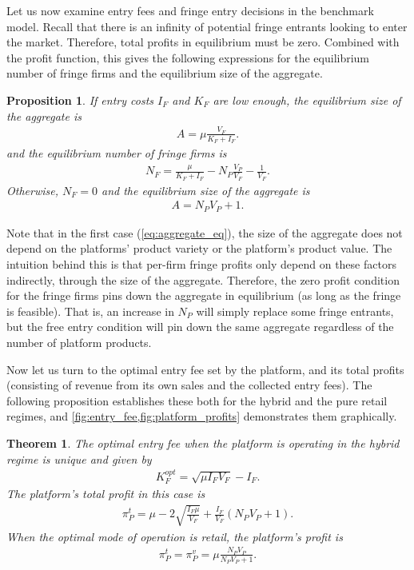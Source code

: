 \documentclass[a4paper]{article}
\newtheorem{proposition}{Proposition}
\newtheorem{theorem}{Theorem}
\begin{document}
Let us now examine entry fees and fringe entry decisions in the benchmark model.
Recall that there is an infinity of potential fringe entrants looking to enter the market.
Therefore, total profits in equilibrium must be zero.
Combined with the  profit function, this gives the following expressions for the equilibrium number of fringe firms and the equilibrium size of the aggregate.
\begin{proposition}
    \label{prop:equilibrium_aggregate_benchmark}
    If entry costs $I_F$ and $K_F$ are low enough, the equilibrium size of the aggregate is
    \begin{align}
        A = \mu \frac{V_F}{K_F + I_F}.
        \label{eq:aggregate_eq}
    \end{align}
    and the equilibrium number of fringe firms is
    \begin{align*}
        N_F = \frac{\mu}{K_F + I_F} - N_P \frac{V_P}{V_F} - \frac{1}{V_F}.
    \end{align*}
    Otherwise,  $N_F = 0$ and the equilibrium size of the aggregate is
    \begin{align*}
        A = N_P V_P + 1.
    \end{align*}
\end{proposition}
Note that in the first case (\cref{eq:aggregate_eq}), the size of the aggregate does not depend on the platforms' product variety or the platform's product value.
The intuition behind this is that per-firm fringe profits only depend on these factors indirectly, through the size of the aggregate.
Therefore, the zero profit condition for the fringe firms pins down the aggregate in equilibrium (as long as the fringe is feasible).
That is, an increase in $N_P$ will simply replace some fringe entrants, but the free entry condition will pin down the same aggregate regardless of the number of platform products.

Now let us turn to the optimal entry fee set by the platform, and its total profits (consisting of revenue from its own sales and the collected entry fees).
The following proposition establishes these both for the hybrid and the pure retail regimes, and \cref{fig:entry_fee,fig:platform_profits} demonstrates them graphically.

\begin{theorem}
    \label{prop:optimal_entry_fee}
    The optimal entry fee when the platform is operating in the hybrid regime is unique and given by
    \begin{align}
        K_F^{opt} = \sqrt{\mu I_F V_F} - I_F. \label{eq:entry_fee_benchmark}
    \end{align}
    The platform's total profit in this case is
    \begin{align}
        \pi_P^{t} = \mu - 2\sqrt{\frac{I_F \mu}{V_F}} + \frac{I_F}{V_F} (N_P V_P + 1). \label{eq:platform_profits_hybrid_benchmark}
    \end{align}
    When the optimal mode of operation is retail, the platform's profit is
    \begin{align}
        \pi_P^{t} = \pi_P^{v} = \mu \frac{ N_P V_P}{N_P V_P + 1}. \label{eq:platform_profits_retail_benchmark}
    \end{align}
\end{theorem}
\end{document}
